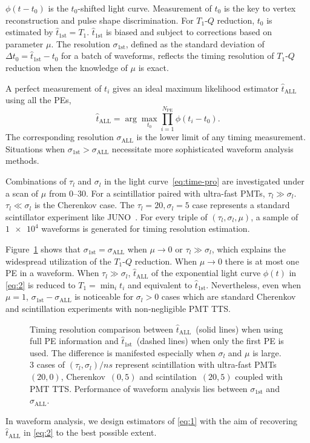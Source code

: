 $\phi(t-t_0)$ is the $t_0$-shifted light curve. Measurement of $t_0$ is the key to vertex reconstruction and pulse shape discrimination.  For $T_1$-$Q$ reduction, $t_0$ is estimated by $\hat{t}_\mathrm{1st} = T_1$. $\hat{t}_\mathrm{1st}$ is biased and subject to corrections based on parameter $\mu$. The resolution $\sigma_\mathrm{1st}$, defined as the standard deviation of $\Delta t_0 = \hat{t}_\mathrm{1st} - t_0$ for a 
batch of waveforms, reflects the timing resolution of $T_1$-$Q$ reduction when the knowledge of $\mu$ is exact.

A perfect measurement of $t_i$ gives an ideal maximum likelihood estimator $\hat{t}_\mathrm{ALL}$ using all the PEs,
\begin{equation}
  \label{eq:2}
  \hat{t}_\mathrm{ALL} = \arg\underset{t_0}{\max} \prod_{i=1}^{N_\mathrm{PE}} \phi(t_i-t_0).
\end{equation}
The corresponding resolution $\sigma_\mathrm{ALL}$ is the lower limit of any timing measurement.  Situations when $\sigma_\mathrm{1st} > \sigma_\mathrm{ALL}$ necessitate more sophisticated waveform analysis methods.

Combinations of $\tau_l$ and $\sigma_l$ in the light curve~\eqref{eq:time-pro} are investigated under a scan of $\mu$ from \numrange{0}{30}. For a scintillatior paired with ultra-fast PMTs, $\tau_l \gg \sigma_l$.  $\tau_l \ll \sigma_l$ is the Cherenkov case.  The $\tau_l=20, \sigma_l=5$ case represents a standard scintillator experiment like JUNO~\cite{rebber_particle_2021}.  For every triple of $(\tau_l, \sigma_l, \mu)$, a sample of $\num[retain-unity-mantissa=false]{1e4}$ waveforms is generated for timing resolution estimation.

Figure~\ref{fig:reso-diff} shows that $\sigma_{\mathrm{1st}}=\sigma_{\mathrm{ALL}}$ when $\mu \to 0$ or $\tau_l \gg \sigma_l$, which explains the widespread utilization of the $T_1$-$Q$ reduction.  When $\mu \to 0$ there is at most one PE in a waveform.  When $\tau_l \gg \sigma_l$, $\hat{t}_\mathrm{ALL}$ of the exponential light curve $\phi(t)$ in \eqref{eq:2} is reduced to $T_1 = \min_i t_i$ and equivalent to $\hat{t}_\mathrm{1st}$. Nevertheless, even when $\mu = 1$, $\sigma_{\mathrm{1st}} - \sigma_{\mathrm{ALL}}$ is noticeable for $\sigma_l > 0$ cases which are standard Cherenkov and scintillation experiments with non-negligible PMT TTS. 
\begin{figure}[H]
  \centering
  \scalebox{0.63}{}
  \caption{\label{fig:reso-diff} Timing resolution comparison between $\hat{t}_{\mathrm{ALL}}$~(solid lines) when using full PE information and $\hat{t}_\mathrm{1st}$~(dashed lines) when only the first PE is used.  The difference is manifested especially when $\sigma_l$ and $\mu$ is large.  3 cases of $(\tau_l, \sigma_l)/\si{ns}$ represent scintillation with ultra-fast PMTs~$(20,0)$, Cherenkov~$(0, 5)$ and scintilation~$(20, 5)$ coupled with PMT TTS. Performance of waveform analysis lies between $\sigma_{\mathrm{1st}}$ and $\sigma_{\mathrm{ALL}}$. }
\end{figure}

In waveform analysis, we design estimators of \eqref{eq:1} with the aim of recovering $\hat{t}_\mathrm{ALL}$ in \eqref{eq:2} to the best possible extent. 
